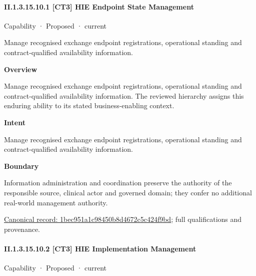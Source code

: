 \paragraph*{II.1.3.15.10.1 [CT3] HIE Endpoint State Management}
\label{navigation:II.1.3.15.10.1}

\label{element:1bec951a1c98450b8d4672c5c424f9bd}
{\small Capability · Proposed · current}\par

Manage recognised exchange endpoint registrations, operational standing and contract-qualified availability information.



\textbf{Overview}



Manage recognised exchange endpoint registrations, operational standing and contract-qualified availability information. The reviewed hierarchy assigns this enduring ability to its stated business-enabling context.



\textbf{Intent}



Manage recognised exchange endpoint registrations, operational standing and contract-qualified availability information.



\textbf{Boundary}



Information administration and coordination preserve the authority of the responsible source, clinical actor and governed domain; they confer no additional real-world management authority.


{\footnotesize \href{../../../../continuum/strategy/capability/1bec951a1c98450b8d4672c5c424f9bd.md}{Canonical record: 1bec951a1c98450b8d4672c5c424f9bd}; full qualifications and provenance.}\par
\paragraph*{II.1.3.15.10.2 [CT3] HIE Implementation Management}
\label{navigation:II.1.3.15.10.2}

\label{element:8ce29be373e04252b7aa881b6a72f375}
{\small Capability · Proposed · current}\par

